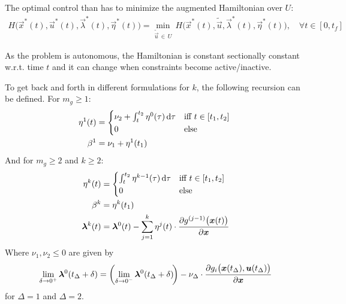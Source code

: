 				The optimal control than has to minimize the augmented Hamiltonian over \(U\):
				\begin{align*}
					H\big(\vec{x}^\ast(t), \vec{u}^\ast(t), \vec{\lambda}^\ast(t), \vec{\eta}^\ast(t)\big) = \min_{\tilde{\vec{u}} \,\in\, U} \, H\big(\vec{x}^\ast(t), \tilde{\vec{u}}, \vec{\lambda}^\ast(t), \vec{\eta}^\ast(t)\big),\quad \forall t \in [0, t_f]
				\end{align*}

				As the problem is autonomous, the Hamiltonian is constant sectionally constant w.r.t. time \(t\) and it can change when constraints become active/inactive.

				To get back and forth in different formulations for \(k\), the following recursion can be defined. For \( m_g \geq 1 \):
				\begin{align*}
					\eta^1(t) & =
					\begin{cases*}
						\nu_2 + \int_{t}^{t_2} \eta^0(\tau) \dd{\tau} & iff \( t \in [t_1, t_2] \) \\
						0                                             & else
					\end{cases*} \\
					\beta^1   & = \nu_1 + \eta^1(t_1)
				\end{align*}
				And for \( m_g \geq 2 \) and \( k \geq 2 \):
				\begin{align*}
					\eta^k(t)          & =
					\begin{cases*}
						\int_{t}^{t_2} \eta^{k - 1}(\tau) \dd{\tau} & iff \( t \in [t_1, t_2] \) \\
						0                                           & else
					\end{cases*}                                                    \\
					\beta^k            & = \eta^k(t_1)                                                                                          \\
					\vec{\lambda}^k(t) & = \vec{\lambda}^0(t) - \sum_{j = 1}^{k} \eta^j(t) \cdot \pdv{g^{(j - 1)}\big(\vec{x}(t)\big)}{\vec{x}}
				\end{align*}
				Where \( \nu_1, \nu_2 \leq 0 \) are given by
				\begin{align*}
					\lim\limits_{\delta \to 0^+} \bm{\lambda}^0(t_\Delta + \delta) = \bigg(\! \lim\limits_{\delta \to 0^-} \bm{\lambda}^0(t_\Delta + \delta) \!\bigg) - \nu_\Delta \cdot \pdv{g_i\big(\bm{x}(t_\Delta), \bm{u}(t_\Delta)\big)}{\bm{x}}
				\end{align*}
				for \( \Delta = 1 \) and \( \Delta = 2 \).

